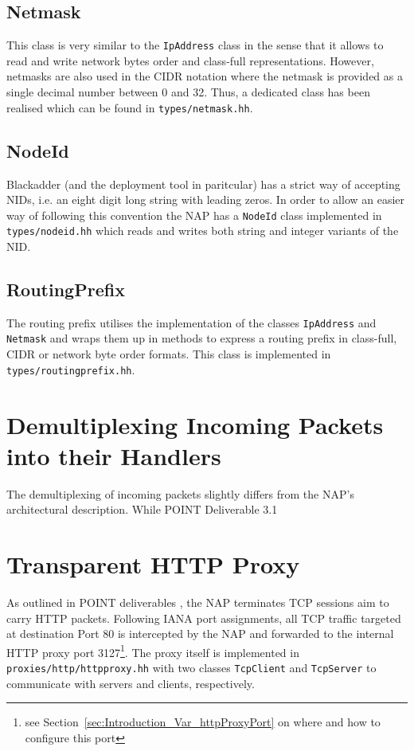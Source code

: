 \documentclass[a4paper,11pt,titlepage]{report}
\begin{document}
\subsection{Netmask}\label{sec:Types_Netmask}
This class is very similar to the \texttt{IpAddress} class in the sense that it allows to read and write network bytes order and class-full representations. However, netmasks are also used in the CIDR notation where the netmask is provided as a single decimal number between 0 and 32. Thus, a dedicated class has been realised which can be found in  \texttt{types/netmask.hh}.

\subsection{NodeId}\label{sec:Types_NodeId}
Blackadder (and the deployment tool in paritcular) has a strict way of accepting \acp{NID}, i.e. an eight digit long string with leading zeros. In order to allow an easier way of following this convention the \ac{NAP} has a \texttt{NodeId} class implemented in \texttt{types/nodeid.hh} which reads and writes both string and integer variants of the \ac{NID}.

\subsection{RoutingPrefix}\label{sec:Types_RoutingPrefix}
The routing prefix utilises the implementation of the classes \texttt{IpAddress} and \texttt{Netmask} and wraps them up in methods to express a routing prefix in class-full, CIDR or network byte order formats. This class is implemented in  \texttt{types/routingprefix.hh}.

\section{Demultiplexing Incoming Packets into their Handlers}
The demultiplexing of incoming packets slightly differs from the \ac{NAP}'s architectural description. While \ac{POINT} Deliverable 3.1 \cite{POINT-D3.1}
\section{Transparent HTTP Proxy}\label{sec:Code_Transparent_HTTP_Proxy}
As outlined in POINT deliverables \cite{POINT}, the \ac{NAP} terminates TCP sessions aim to carry HTTP packets. Following IANA port assignments, all TCP traffic targeted at destination Port 80 is intercepted by the \ac{NAP} and forwarded to the internal HTTP proxy port 3127\footnote{see Section~\ref{sec:Introduction_Var_httpProxyPort} on where and how to configure this port}. The proxy itself is implemented in \texttt{proxies/http/httpproxy.hh} with two classes \texttt{TcpClient} and \texttt{TcpServer} to communicate with servers and clients, respectively.
\end{document}
